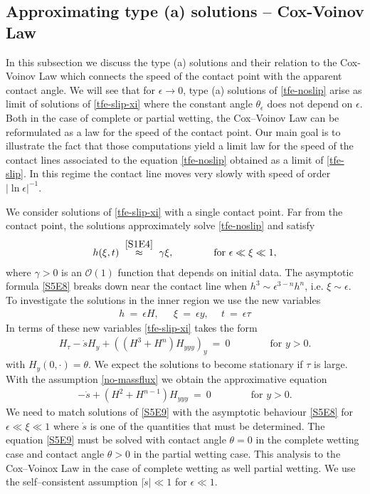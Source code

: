 \documentclass[pagesize,pdftex]{amsart}
\newcommand{\OO}{{\mathcal O}}
\newcommand{\gam}{\gamma}
\newcommand{\eps}{\epsilon}
\newcommand{\ang}{\theta}
\newcommand{\lupref}[2]{\hspace{0ex} \stackrel{\eqref{#1}}{#2}} %
\begin{document}
\subsection{Approximating type (a) solutions -- Cox-Voinov Law} \label{ss-TannerCV}

In this subsection we discuss the type (a) solutions and their relation to the
Cox-Voinov Law which connects the speed of the contact point with the
  apparent contact angle.  We will see that for $\eps \to 0$, type (a)
solutions of \eqref{tfe-noslip} arise as limit of solutions of
\eqref{tfe-slip-xi} where the constant angle $\ang_\eps$ does not depend on
$\eps$. Both in the case of complete or partial wetting, the Cox--Voinov Law can
be reformulated as a law for the speed of the contact point. Our main goal is to
illustrate the fact that those computations yield a limit law for the speed of
the contact lines associated to the equation \eqref{tfe-noslip} obtained as a
limit of \eqref{tfe-slip}. In this regime the contact line moves very slowly
with speed of order $|\ln \eps|^{-1}$.

\medskip

We consider solutions of \eqref{tfe-slip-xi} with a single contact point.  Far
from the contact point, the solutions approximately solve \eqref{tfe-noslip} and satisfy
\begin{align} \label{S5E8} %
  h(\xi,t) \ %
  \lupref{S1E4}\approx \ \gam \xi, \qquad\qquad \text{for $\eps \ll \xi \ll 1$},
\end{align}%
where $\gam >0$ is an $\OO(1)$ function that depends on
initial data. The asymptotic formula \eqref{S5E8} breaks down near the contact line when
$h^3 \sim \eps^{3-n}h^{n}$, i.e.  $\xi \sim \eps$. To investigate the solutions in the inner
region we use the new variables%
\begin{align} \label{inner-var-a} %
  h \ = \ \eps H,\ \quad \ \xi \ = \ \eps y,\ \quad  t \ = \ \eps \tau  
\end{align}
In terms of these new variables \eqref{tfe-slip-xi} takes the form
\begin{align}
  H_{\tau }-\dot s H_y+ \left(\left(H^3+H^{n}\right)
  H_{yyy}\right)_y \ %
  = \ 0 \qquad\qquad
  \text{for $y>0$}. 
\end{align}
with $H_y(0,\cdot) = \ang$.  We expect the solutions to become stationary if
$\tau $ is large. With the assumption \eqref{no-massflux} we obtain the
approximative equation
\begin{align}   \label{S5E9} %
  -\dot s + (H^2+H^{n-1}) H_{yyy} \ = \ 0 \qquad\qquad
  \text{for $y>0$}.
\end{align}
We need to match solutions of \eqref{S5E9} with the asymptotic behaviour
\eqref{S5E8} for $\eps \ll \xi\ll 1$ where $\dot s$ is one of the quantities
that must be determined. The equation \eqref{S5E9} must be solved with contact
angle $\ang = 0$ in the complete wetting case and contact angle $\ang > 0$ in
the partial wetting case. This analysis to the Cox--Voinox Law in the case of
complete wetting as well partial wetting. We use the self--consistent assumption
$|\dot s| \ll 1$ for $\eps \ll 1$.
\end{document}
